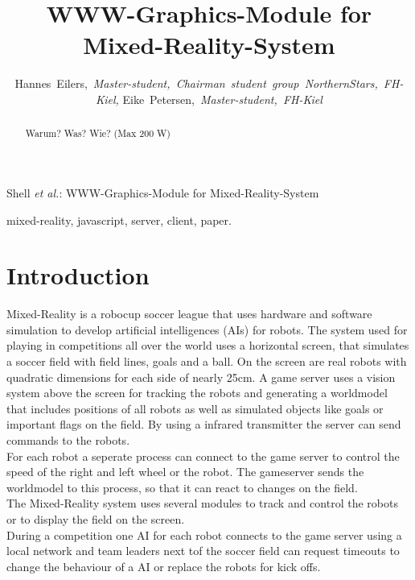 \documentclass[journal]{IEEEtran}
\begin{document}
\title{WWW-Graphics-Module for Mixed-Reality-System}

\author{Hannes~Eilers,~\textit{Master-student,~Chairman~student~group~NorthernStars,~FH-Kiel,}
        Eike~Petersen,~\textit{Master-student,~FH-Kiel}}

%
{Shell \MakeLowercase{\textit{et al.}}: WWW-Graphics-Module for Mixed-Reality-System}

\maketitle

\begin{abstract}
	Warum? Was? Wie? (Max 200 W)
\end{abstract}
\begin{IEEEkeywords}
mixed-reality, javascript, server, client, paper.
\end{IEEEkeywords}

\section{Introduction}

Mixed-Reality is a robocup soccer league that uses hardware and software
simulation to develop artificial intelligences (AIs) for robots. The system
used for playing in competitions all over the world uses a horizontal screen, that
simulates a soccer field with field lines, goals and a ball. On the screen are
real robots with quadratic dimensions for each side of nearly 25cm. A game
server uses a vision system above the screen for tracking the robots and
generating a worldmodel that includes positions of all robots as well as
simulated objects like goals or important flags on the field. By using a
infrared transmitter the server can send commands to the robots.\\
For each robot a seperate process can connect to the game server to control the
speed of the right and left wheel or the robot. The gameserver sends the
worldmodel to this process, so that it can react to changes on the field.\\
The Mixed-Reality system uses several modules to track and control the robots or
to display the field on the screen.\\
During a competition one AI for each robot connects to the game server using a
local network and team leaders next tof the soccer field can request timeouts to
change the behaviour of a AI or replace the robots for kick offs.
\end{document}

